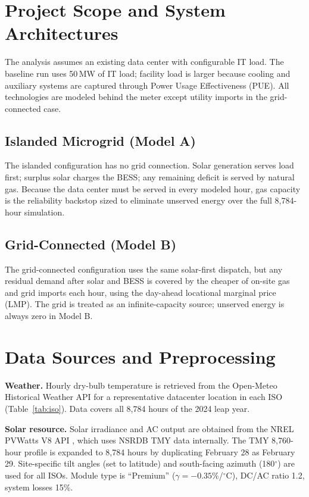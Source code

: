 \documentclass[conference]{IEEEtran}
\begin{document}
\section{Project Scope and System Architectures}
\label{sec:scope}

The analysis assumes an existing data center with configurable IT load.
The baseline run uses 50\,MW of IT load; facility load is larger because
cooling and auxiliary systems are captured through Power Usage Effectiveness
(PUE).
All technologies are modeled behind the meter except utility imports in the
grid-connected case.

\subsection{Islanded Microgrid (Model A)}

The islanded configuration has no grid connection.
Solar generation serves load first; surplus solar charges the BESS; any
remaining deficit is served by natural gas.
Because the data center must be served in every modeled hour, gas capacity is
the reliability backstop sized to eliminate unserved energy over the full
8,784-hour simulation.

\subsection{Grid-Connected (Model B)}

The grid-connected configuration uses the same solar-first dispatch, but any
residual demand after solar and BESS is covered by the cheaper of on-site gas
and grid imports each hour, using the day-ahead locational marginal price
(LMP).
The grid is treated as an infinite-capacity source; unserved energy is always
zero in Model B.

\section{Data Sources and Preprocessing}
\label{sec:data}

\textbf{Weather.}
Hourly dry-bulb temperature is retrieved from the Open-Meteo Historical
Weather API \cite{b5} for a representative datacenter location in each ISO
(Table~\ref{tab:iso}).
Data covers all 8,784 hours of the 2024 leap year.

\textbf{Solar resource.}
Solar irradiance and AC output are obtained from the NREL PVWatts V8
API \cite{b3}, which uses NSRDB TMY data internally.
The TMY 8,760-hour profile is expanded to 8,784 hours by duplicating
February 28 as February 29.
Site-specific tilt angles (set to latitude) and south-facing azimuth
(180$^\circ$) are used for all ISOs.
Module type is ``Premium'' ($\gamma = -0.35$\%/$^\circ$C), DC/AC ratio 1.2,
system losses 15\%.
\end{document}
